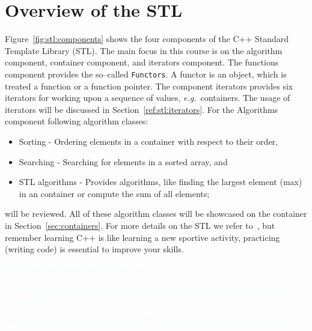 \section{Overview of the STL}
Figure~\ref{fig:stl:components} shows the four components of the C++ Standard Template Library (STL). The main focus in this course is on the algorithm component, container component, and iterators component. The functions component provides the so--called \texttt{Functors}. A functor is an object, which is treated a function or a function pointer. The component iterators provides six iterators for working upon a sequence of values, \emph{e.g.}\ containers. The usage of iterators will be discussed in Section~\ref{ref:stl:iterators}. For the Algorithms component following algorithm classes:
\begin{itemize}
\item Sorting - Ordering elements in a container with respect to their order,
\item Searching - Searching for elements in a sorted array, and
\item STL algorithms - Provides algorithms, like finding the largest element (max) in an container or compute the sum of all elements;
\end{itemize}
will be reviewed. All of these algorithm classes will be showcased on the container  in Section~\ref{sec:containers}. For more details on the STL we refer to~\cite{o2017mastering,stepanov1995standard}, but remember learning C++ is like learning a new sportive activity, practicing (writing code) is essential to improve your skills.\\ 

\textcolor{azure}{Most important take away of this section is: 
\begin{itemize}
\item Never implement your own algorithm or container, if you can find it within the STL.
\item If you can not find it within the STL, think if you really need this feature.
\end{itemize}
}

